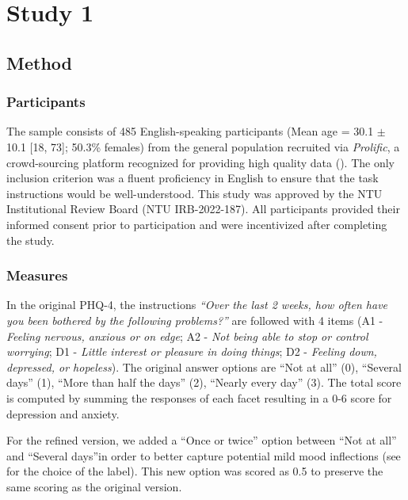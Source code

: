 \documentclass[
  man,
  floatsintext,
  longtable,
  nolmodern,
  notxfonts,
  notimes,
  colorlinks=true,linkcolor=blue,citecolor=blue,urlcolor=blue]{apa7}
\begin{document}
\section{Study 1}\label{study-1}

\subsection{Method}\label{method}

\subsubsection{Participants}\label{participants}

The sample consists of 485 English-speaking participants (Mean age =
30.1 \(\pm\) 10.1 {[}18, 73{]}; 50.3\% females) from the general
population recruited via \emph{Prolific}, a crowd-sourcing platform
recognized for providing high quality data
(). The only inclusion
criterion was a fluent proficiency in English to ensure that the task
instructions would be well-understood. This study was approved by the
NTU Institutional Review Board (NTU IRB-2022-187). All participants
provided their informed consent prior to participation and were
incentivized after completing the study.

\subsubsection{Measures}\label{measures}

In the original PHQ-4, the instructions \emph{``Over the last 2 weeks,
how often have you been bothered by the following problems?''} are
followed with 4 items (A1 - \emph{Feeling nervous, anxious or on edge};
A2 - \emph{Not being able to stop or control worrying}; D1 -
\emph{Little interest or pleasure in doing things}; D2 - \emph{Feeling
down, depressed, or hopeless}). The original answer options are ``Not at
all'' (0), ``Several days'' (1), ``More than half the days'' (2),
``Nearly every day'' (3). The total score is computed by summing the
responses of each facet resulting in a 0-6 score for depression and
anxiety.

For the refined version, we added a ``Once or twice'' option between
``Not at all'' and ``Several days''in order to better capture potential
mild mood inflections (see  for the choice of the label). This new option was
scored as 0.5 to preserve the same scoring as the original version.
\end{document}
